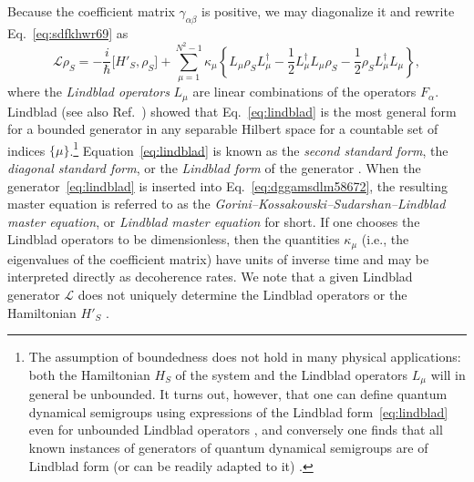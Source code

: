 \documentclass[3p,sort&compress]{elsarticle}
\newcommand{\I}{\ensuremath{i}}
\newcommand{\op}[1]{#1}
\begin{document}
Because the coefficient matrix $\gamma_{\alpha\beta}$ is positive, we may diagonalize it and rewrite Eq.~\eqref{eq:sdfkhwr69} as
%
\begin{equation}\label{eq:lindblad}
\mathcal{L}\op{\rho}_S = -\frac{\I}{\hbar} \bigl[
  \op{H}'_S, \op{\rho}_S \bigr] + \sum_{\mu=1}^{N^2-1} \kappa_\mu \left\{
\op{L}_\mu \op{\rho}_S \op{L}^\dagger_\mu - \frac{1}{2} \op{L}^\dagger_\mu\op{L}_\mu \op{\rho}_S
- \frac{1}{2} \op{\rho}_S\op{L}^\dagger_\mu\op{L}_\mu \right\},
\end{equation}
%
where the \emph{Lindblad operators} $\op{L}_\mu$ are linear combinations of the operators $\op{F}_\alpha$. Lindblad \cite{Lindblad:1976:um} (see also Ref.~\cite{Gorini:1978:uf}) showed that Eq.~\eqref{eq:lindblad} is the most general form for a bounded generator in any separable Hilbert space for a countable set of indices $\{\mu\}$.\footnote{The assumption of boundedness does not hold in many physical applications: both the Hamiltonian $\op{H}_S$ of the system and the Lindblad operators $\op{L}_\mu$ will in general be unbounded. It turns out, however, that one can define quantum dynamical semigroups using expressions of the Lindblad form~\eqref{eq:lindblad} even for unbounded Lindblad operators \cite{Davies:1976:uu,Holevo:1996:ll}, and conversely one finds that all known instances of generators of quantum dynamical semigroups are of Lindblad form (or can be readily adapted to it) \cite{Breuer:2002:oq,Alicki:2007:uu}.}  Equation~\eqref{eq:lindblad} is known as the \emph{second standard form}, the \emph{diagonal standard form}, or the \emph{Lindblad form} of the generator \cite{Breuer:2002:oq,Alicki:2007:uu}. When the generator~\eqref{eq:lindblad} is inserted into Eq.~\eqref{eq:dggamsdlm58672}, the resulting master equation is referred to as the \emph{Gorini--Kossakowski--Sudarshan--Lindblad master equation}, or \emph{Lindblad master equation} for short. If one chooses the Lindblad operators to be dimensionless, then the quantities $\kappa_\mu$ (i.e., the eigenvalues of the coefficient matrix) have units of inverse time and may be interpreted directly as decoherence rates. We note that a given Lindblad generator $\mathcal{L}$ does not uniquely determine the Lindblad operators or the Hamiltonian $\op{H}'_S$ \cite{Breuer:2002:oq}.
\end{document}
